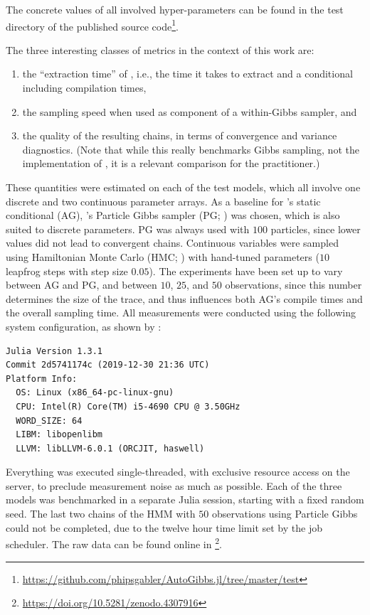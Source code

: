 The concrete values of all involved hyper-parameters can be found in the test directory of the
published source
code\footnote{\protect\href{https://github.com/phipsgabler/AutoGibbs.jl/tree/2b433f8f5c37a55f63fbf175193130b46c8b569f/test}{\url{https://github.com/phipsgabler/AutoGibbs.jl/tree/master/test}}}.

The three interesting classes of metrics in the context of this work are:
\begin{enumerate}
  \firmlist
\item the \enquote{extraction time} of \autogibbsjl{}, i.e., the time it takes to extract and a
  conditional including compilation times,
\item the sampling speed when used as component of a within-Gibbs sampler, and
\item the quality of the resulting chains, in terms of convergence and variance diagnostics.  (Note
  that while this really benchmarks Gibbs sampling, not the implementation of \autogibbsjl{}, it is
  a relevant comparison for the practitioner.)
\end{enumerate}
These quantities were estimated on each of the test models, which all involve one discrete and two
continuous parameter arrays.  As a baseline for \autogibbsjl{}'s static conditional (AG),
\turingjl{}'s Particle Gibbs sampler (PG; \textcite[see]{andrieu2010particlea}) was chosen, which is
also suited to discrete parameters.  PG was always used with \(100\) particles, since lower values
did not lead to convergent chains.  Continuous variables were sampled using Hamiltonian Monte Carlo
(HMC; \textcite[see]{betancourt2018conceptual}) with hand-tuned parameters (\(10\) leapfrog steps
with step size \(0.05\)).  The experiments have been set up to vary between AG and PG, and between
\(10\), \(25\), and \(50\) observations, since this number determines the size of the trace, and
thus influences both AG's compile times and the overall sampling time.  All measurements were
conducted using the following system configuration, as shown by
:
\begin{lstlisting}
Julia Version 1.3.1
Commit 2d5741174c (2019-12-30 21:36 UTC)
Platform Info:
  OS: Linux (x86_64-pc-linux-gnu)
  CPU: Intel(R) Core(TM) i5-4690 CPU @ 3.50GHz
  WORD_SIZE: 64
  LIBM: libopenlibm
  LLVM: libLLVM-6.0.1 (ORCJIT, haswell)
\end{lstlisting}
Everything was executed single-threaded, with exclusive resource access on the server, to preclude
measurement noise as much as possible.  Each of the three models was benchmarked in a separate Julia
session, starting with a fixed random seed.  The last two chains of the HMM with \(50\) observations
using Particle Gibbs could not be completed, due to the twelve hour time limit set by the job
scheduler.  The raw data can be found online in
\textcite{gabler2020mcmc}\footnote{\protect\url{https://doi.org/10.5281/zenodo.4307916}}.

